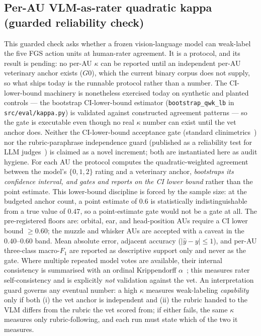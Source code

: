 \subsection{Per-AU VLM-as-rater quadratic kappa (guarded reliability check)}

This guarded check asks whether a frozen vision-language model can weak-label the five
FGS action units at human-rater agreement. It is a protocol, and its result is pending: no per-AU
$\kappa$ can be reported until an independent per-AU veterinary anchor exists ($G0$), which the
current binary corpus does not supply, so what ships today is the runnable protocol rather than a
number. The CI-lower-bound machinery is nonetheless exercised today on synthetic and planted
controls --- the bootstrap CI-lower-bound estimator (\texttt{bootstrap\_qwk\_lb} in
\texttt{src/eval/kappa.py}) is validated against constructed agreement patterns --- so the gate
is executable even though no real $\kappa$ number can exist until the vet anchor does. Neither the
CI-lower-bound acceptance gate (standard
clinimetrics~\cite{tractenberg2010kappa,donner2010kappa,rotondi2012kappa,rotondi2018kappasize,simwright2005kappa})
nor the
rubric-paraphrase independence guard (published as a reliability test for LLM
judges~\cite{weng2026policy}) is claimed as a novel increment; both are instantiated here as
audit hygiene. For each AU the protocol computes the quadratic-weighted
agreement \cite{cohen1968kappa} between the model's $\{0,1,2\}$ rating and a veterinary
anchor, \emph{bootstraps its confidence interval, and gates and reports on the CI lower bound}
rather than the point estimate. This lower-bound discipline is forced by the sample size: at
the budgeted anchor count, a point estimate of $0.6$ is statistically indistinguishable from a
true value of $0.47$, so a point-estimate gate would not be a gate at all. The pre-registered
floors are: orbital, ear, and head-position AUs require a CI lower bound $\geq 0.60$; the
muzzle and whisker AUs are accepted with a caveat in the $0.40\text{--}0.60$ band. Mean
absolute error, adjacent accuracy ($|\hat{y}-y|\leq 1$), and per-AU three-class macro-$F_1$ are
reported as descriptive support only and never as the gate. Where multiple repeated model votes
are available, their internal consistency is summarised with an ordinal Krippendorff
$\alpha$~\cite{krippendorff2004}; this measures rater self-consistency and is explicitly
\emph{not} validation against the vet. An interpretation guard governs any eventual number: a
high $\kappa$ measures weak-labeling \emph{capability} only if both (i) the vet anchor is
independent and (ii) the rubric handed to the VLM differs from the rubric the vet scored from;
if either fails, the same $\kappa$ measures only rubric-following, and each run must state which
of the two it measures.

